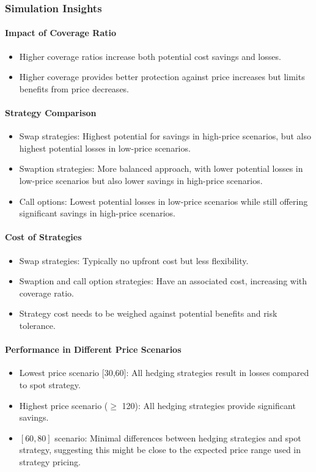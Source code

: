 \documentclass[12pt]{article}
\begin{document}
\subsubsection{Simulation Insights}

\paragraph{Impact of Coverage Ratio}
\begin{itemize}
    \item Higher coverage ratios increase both potential cost savings and losses.
    \item Higher coverage provides better protection against price increases but limits benefits from price decreases.
\end{itemize}

\paragraph{Strategy Comparison}
\begin{itemize}
    \item Swap strategies: Highest potential for savings in high-price scenarios, but also highest potential losses in low-price scenarios.
    \item Swaption strategies: More balanced approach, with lower potential losses in low-price scenarios but also lower savings in high-price scenarios.
    \item Call options: Lowest potential losses in low-price scenarios while still offering significant savings in high-price scenarios.
\end{itemize}

\paragraph{Cost of Strategies}
\begin{itemize}
    \item Swap strategies: Typically no upfront cost but less flexibility.
    \item Swaption and call option strategies: Have an associated cost, increasing with coverage ratio.
    \item Strategy cost needs to be weighed against potential benefits and risk tolerance.
\end{itemize}

\paragraph{Performance in Different Price Scenarios}
\begin{itemize}
    \item Lowest price scenario [30,60]: All hedging strategies result in losses compared to spot strategy.
    \item Highest price scenario ($\geq$ 120): All hedging strategies provide significant savings.
    \item $[60,80]$ scenario: Minimal differences between hedging strategies and spot strategy, suggesting this might be close to the expected price range used in strategy pricing.
\end{itemize}
\end{document}

